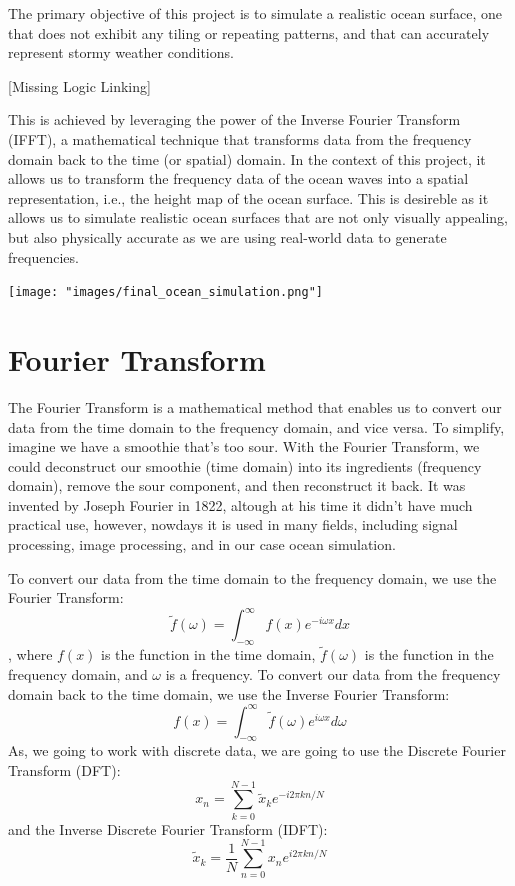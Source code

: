 The primary objective of this project is to simulate a realistic ocean surface, 
one that does not exhibit any tiling or repeating patterns, and that can accurately 
represent stormy weather conditions.

[Missing Logic Linking]

This is achieved by leveraging the power of the Inverse Fourier Transform (IFFT), a mathematical technique that transforms data 
from the frequency domain back to the time (or spatial) domain. In the context of this project, 
it allows us to transform the frequency data of the ocean waves into a spatial representation, i.e., the height map of the ocean surface. This is
desireble as it allows us to simulate realistic ocean surfaces that are not only visually appealing, but also physically accurate as 
we are using real-world data to generate frequencies.

\begin{minipage}{1\textwidth}
    \centering
    \texttt{[image: "images/final\_ocean\_simulation.png"]}
    \label{fig:ocean_simulation}
\end{minipage}

\section{Fourier Transform}
The Fourier Transform is a mathematical method that enables us to convert our data from the time domain to the frequency domain, and vice versa. To simplify, imagine we have a smoothie that’s too sour. With the Fourier Transform, we could deconstruct our smoothie (time domain) into its ingredients (frequency domain), remove the sour component, and then reconstruct it back.
It was invented by Joseph Fourier\cite{fourier1822} in 1822, altough at his time it didn't have much practical use, however, nowdays it is used in many fields, including signal processing, image processing, and in our case ocean simulation.

To convert our data from the time domain to the frequency domain, we use the Fourier Transform:
\begin{equation}
\tilde{f}(\omega) = \int_{-\infty}^{\infty} f(x) e^{-i \omega x} dx
\end{equation}
, where $f(x)$ is the function in the time domain, $\tilde{f}(\omega)$ is the function in the frequency domain, and $\omega$ is a frequency.
To convert our data from the frequency domain back to the time domain, we use the Inverse Fourier Transform:
\begin{equation}
f(x) = \int_{-\infty}^{\infty} \tilde{f}(\omega) e^{i \omega x} d\omega
\end{equation}
As, we going to work with discrete data, we are going to use the Discrete Fourier Transform (DFT):
\begin{equation}
    x_n = \sum_{k=0}^{N-1} \tilde{x}_k e^{-i 2 \pi k n / N}
\end{equation}
and the Inverse Discrete Fourier Transform (IDFT):
\begin{equation}
    \tilde{x}_k = \frac{1}{N} \sum_{n=0}^{N-1} x_n e^{i 2 \pi k n / N}
    \label{eq:idft}
\end{equation}

